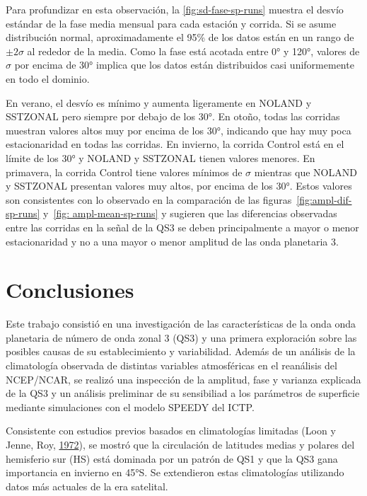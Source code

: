 \documentclass[spanish,a4paper,12pt,oneside]{book}
\begin{document}
Para profundizar en esta observación, la \autoref{fig:sd-fase-sp-runs}
muestra el desvío estándar de la fase media mensual para cada estación y
corrida. Si se asume distribución normal, aproximadamente el 95\% de los
datos están en un rango de \(\pm 2\sigma\) al rededor de la media. Como
la fase está acotada entre 0° y 120°, valores de \(\sigma\) por encima
de 30° implica que los datos están distribuidos casi uniformemente en
todo el dominio.

En verano, el desvío es mínimo y aumenta ligeramente en NOLAND y
SSTZONAL pero siempre por debajo de los 30°. En otoño, todas las
corridas muestran valores altos muy por encima de los 30°, indicando que
hay muy poca estacionaridad en todas las corridas. En invierno, la
corrida Control está en el límite de los 30° y NOLAND y SSTZONAL tienen
valores menores. En primavera, la corrida Control tiene valores mínimos
de \(\sigma\) mientras que NOLAND y SSTZONAL presentan valores muy
altos, por encima de los 30°. Estos valores son consistentes con lo
observado en la comparación de las figuras~\ref{fig:ampl-dif-sp-runs}
y~\ref{fig: ampl-mean-sp-runs} y sugieren que las diferencias observadas
entre las corridas en la señal de la QS3 se deben principalmente a mayor
o menor estacionaridad y no a una mayor o menor amplitud de las onda
planetaria 3.

\chapter{Conclusiones}\label{conclusiones}

Este trabajo consistió en una investigación de las características de la
onda onda planetaria de número de onda zonal 3 (QS3) y una primera
exploración sobre las posibles causas de su establecimiento y
variabilidad. Además de un análisis de la climatología observada de
distintas variables atmosféricas en el reanálisis del NCEP/NCAR, se
realizó una inspección de la amplitud, fase y varianza explicada de la
QS3 y un análisis preliminar de su sensibiliad a los parámetros de
superficie mediante simulaciones con el modelo SPEEDY del ICTP.

Consistente con estudios previos basados en climatologías limitadas
(Loon y Jenne, Roy, \protect\hyperlink{ref-Loon1972}{1972}), se mostró
que la circulación de latitudes medias y polares del hemisferio sur (HS)
está dominada por un patrón de QS1 y que la QS3 gana importancia en
invierno en 45°S. Se extendieron estas climatologías utilizando datos
más actuales de la era satelital.
\end{document}
